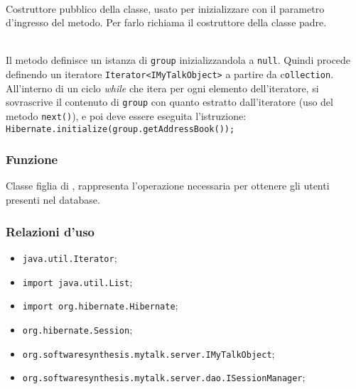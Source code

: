 \begin{description}
	\item{}\\
	Costruttore pubblico della classe, usato per inizializzare  con il parametro d'ingresso del metodo. Per farlo richiama il costruttore della classe padre.

	\item{}\\
	Il metodo definisce un istanza di  \texttt{group} inizializzandola a \texttt{null}. Quindi procede definendo un iteratore \texttt{Iterator<IMyTalkObject>} a partire da c\texttt{ollection}. All'interno di un ciclo \textit{while} che itera per ogni elemento dell'iteratore, si sovrascrive il contenuto di \texttt{group} con quanto estratto dall'iteratore (uso del metodo \texttt{next()}), e poi deve essere eseguita l'istruzione:\\
	
	\verb|Hibernate.initialize(group.getAddressBook());|

\end{description}


\subsubsection*{Funzione}
Classe figlia di , rappresenta l'operazione necessaria per ottenere gli utenti presenti nel database.

\subsubsection*{Relazioni d'uso}

\begin{itemize}
		\item \texttt{java.util.Iterator};
		\item \texttt{import java.util.List};
		\item \texttt{import org.hibernate.Hibernate};
		\item \texttt{org.hibernate.Session};
		\item \texttt{org.softwaresynthesis.mytalk.server.IMyTalkObject};
		\item \texttt{org.softwaresynthesis.mytalk.server.dao.ISessionManager};
\end{itemize}

